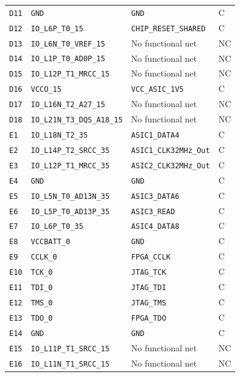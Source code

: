 \documentclass[10pt,a4paper]{article}
\begin{document}
\begin{longtable}{@{}P{15mm}P{42mm}P{92mm}P{10mm}@{}}
\nolinkurl{D11} & \nolinkurl{GND} & \nolinkurl{GND} & C \\
\nolinkurl{D12} & \nolinkurl{IO_L6P_T0_15} & \nolinkurl{CHIP_RESET_SHARED} & C \\
\nolinkurl{D13} & \nolinkurl{IO_L6N_T0_VREF_15} & No functional net & NC \\
\nolinkurl{D14} & \nolinkurl{IO_L1P_T0_AD0P_15} & No functional net & NC \\
\nolinkurl{D15} & \nolinkurl{IO_L12P_T1_MRCC_15} & No functional net & NC \\
\nolinkurl{D16} & \nolinkurl{VCCO_15} & \nolinkurl{VCC_ASIC_1V5} & C \\
\nolinkurl{D17} & \nolinkurl{IO_L16N_T2_A27_15} & No functional net & NC \\
\nolinkurl{D18} & \nolinkurl{IO_L21N_T3_DQS_A18_15} & No functional net & NC \\
\nolinkurl{E1} & \nolinkurl{IO_L18N_T2_35} & \nolinkurl{ASIC1_DATA4} & C \\
\nolinkurl{E2} & \nolinkurl{IO_L14P_T2_SRCC_35} & \nolinkurl{ASIC1_CLK32MHz_Out} & C \\
\nolinkurl{E3} & \nolinkurl{IO_L12P_T1_MRCC_35} & \nolinkurl{ASIC2_CLK32MHz_Out} & C \\
\nolinkurl{E4} & \nolinkurl{GND} & \nolinkurl{GND} & C \\
\nolinkurl{E5} & \nolinkurl{IO_L5N_T0_AD13N_35} & \nolinkurl{ASIC3_DATA6} & C \\
\nolinkurl{E6} & \nolinkurl{IO_L5P_T0_AD13P_35} & \nolinkurl{ASIC3_READ} & C \\
\nolinkurl{E7} & \nolinkurl{IO_L6P_T0_35} & \nolinkurl{ASIC4_DATA8} & C \\
\nolinkurl{E8} & \nolinkurl{VCCBATT_0} & \nolinkurl{GND} & C \\
\nolinkurl{E9} & \nolinkurl{CCLK_0} & \nolinkurl{FPGA_CCLK} & C \\
\nolinkurl{E10} & \nolinkurl{TCK_0} & \nolinkurl{JTAG_TCK} & C \\
\nolinkurl{E11} & \nolinkurl{TDI_0} & \nolinkurl{JTAG_TDI} & C \\
\nolinkurl{E12} & \nolinkurl{TMS_0} & \nolinkurl{JTAG_TMS} & C \\
\nolinkurl{E13} & \nolinkurl{TDO_0} & \nolinkurl{FPGA_TDO} & C \\
\nolinkurl{E14} & \nolinkurl{GND} & \nolinkurl{GND} & C \\
\nolinkurl{E15} & \nolinkurl{IO_L11P_T1_SRCC_15} & No functional net & NC \\
\nolinkurl{E16} & \nolinkurl{IO_L11N_T1_SRCC_15} & No functional net & NC \\

\end{longtable}
\end{document}
